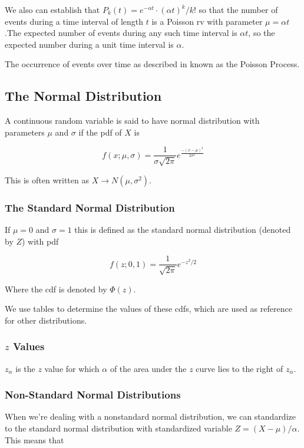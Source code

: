     We also can establish that $P_k(t) = e^{-\alpha t} \cdot {(\alpha t)}^k/k!$ so that the number of events during a
    time interval of length $t$ is a Poisson rv with parameter $\mu = \alpha t$.The expected number of events during any
    such time interval is $\alpha t$, so the expected number during a unit time interval is $\alpha$.

    The occurrence of events over time as described in known as the Poisson Process.



    \subsection{The Normal Distribution}
    A continuous random variable is said to have normal distribution with parameters $\mu$ and $\sigma$ if the pdf of $X$ is

        \[ f(x; \mu, \sigma) = \frac{1}{\sigma \sqrt{2\pi} } e^{\frac{-{(x-\mu)}^2}{2\sigma^2} } \]

    This is often written as $X \to N(\mu, \sigma^2)$.

        \subsubsection{The Standard Normal Distribution}
        If $\mu = 0$ and $\sigma=1$ this is defined as the standard normal distribution (denoted by $Z$) with pdf

            \[ f(z;0,1) = \frac{1}{\sqrt{2\pi} } e^{-z^2/2} \]

        Where the cdf is denoted by $\Phi(z)$.

        We use tables to determine the values of these cdfs, which are used as reference for other distributions.

        \subsubsection{$z$ Values}
        $z_\alpha$ is the $z$ value for which $\alpha$ of the area under the $z$ curve lies to the right of $z_\alpha$.

        \subsubsection{Non-Standard Normal Distributions}
        When we're dealing with a nonstandard normal distribution, we can standardize to the standard normal distribution
        with standardized variable $Z = (X - \mu)/\alpha$. This means that

